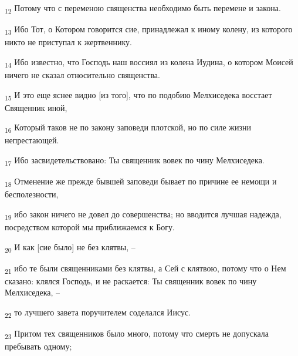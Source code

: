 \begin{tcolorbox}
\textsubscript{12} Потому что с переменою священства необходимо быть перемене и закона.
\end{tcolorbox}
\begin{tcolorbox}
\textsubscript{13} Ибо Тот, о Котором говорится сие, принадлежал к иному колену, из которого никто не приступал к жертвеннику.
\end{tcolorbox}
\begin{tcolorbox}
\textsubscript{14} Ибо известно, что Господь наш воссиял из колена Иудина, о котором Моисей ничего не сказал относительно священства.
\end{tcolorbox}
\begin{tcolorbox}
\textsubscript{15} И это еще яснее видно [из того], что по подобию Мелхиседека восстает Священник иной,
\end{tcolorbox}
\begin{tcolorbox}
\textsubscript{16} Который таков не по закону заповеди плотской, но по силе жизни непрестающей.
\end{tcolorbox}
\begin{tcolorbox}
\textsubscript{17} Ибо засвидетельствовано: Ты священник вовек по чину Мелхиседека.
\end{tcolorbox}
\begin{tcolorbox}
\textsubscript{18} Отменение же прежде бывшей заповеди бывает по причине ее немощи и бесполезности,
\end{tcolorbox}
\begin{tcolorbox}
\textsubscript{19} ибо закон ничего не довел до совершенства; но вводится лучшая надежда, посредством которой мы приближаемся к Богу.
\end{tcolorbox}
\begin{tcolorbox}
\textsubscript{20} И как [сие было] не без клятвы, --
\end{tcolorbox}
\begin{tcolorbox}
\textsubscript{21} ибо те были священниками без клятвы, а Сей с клятвою, потому что о Нем сказано: клялся Господь, и не раскается: Ты священник вовек по чину Мелхиседека, --
\end{tcolorbox}
\begin{tcolorbox}
\textsubscript{22} то лучшего завета поручителем соделался Иисус.
\end{tcolorbox}
\begin{tcolorbox}
\textsubscript{23} Притом тех священников было много, потому что смерть не допускала пребывать одному;
\end{tcolorbox}
